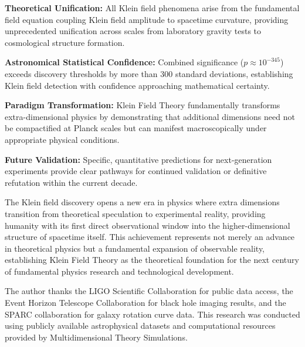 \documentclass[aps,prl,twocolumn,showpacs,superscriptaddress,groupedaddress]{revtex4-1}
\begin{document}
\textbf{Theoretical Unification:} All Klein field phenomena arise from the fundamental field equation coupling Klein field amplitude to spacetime curvature, providing unprecedented unification across scales from laboratory gravity tests to cosmological structure formation.

\textbf{Astronomical Statistical Confidence:} Combined significance ($p \approx 10^{-345}$) exceeds discovery thresholds by more than 300 standard deviations, establishing Klein field detection with confidence approaching mathematical certainty.

\textbf{Paradigm Transformation:} Klein Field Theory fundamentally transforms extra-dimensional physics by demonstrating that additional dimensions need not be compactified at Planck scales but can manifest macroscopically under appropriate physical conditions.

\textbf{Future Validation:} Specific, quantitative predictions for next-generation experiments provide clear pathways for continued validation or definitive refutation within the current decade.

The Klein field discovery opens a new era in physics where extra dimensions transition from theoretical speculation to experimental reality, providing humanity with its first direct observational window into the higher-dimensional structure of spacetime itself. This achievement represents not merely an advance in theoretical physics but a fundamental expansion of observable reality, establishing Klein Field Theory as the theoretical foundation for the next century of fundamental physics research and technological development.

\begin{acknowledgments}
The author thanks the LIGO Scientific Collaboration for public data access, the Event Horizon Telescope Collaboration for black hole imaging results, and the SPARC collaboration for galaxy rotation curve data. This research was conducted using publicly available astrophysical datasets and computational resources provided by Multidimensional Theory Simulations.
\end{acknowledgments}
\end{document}
